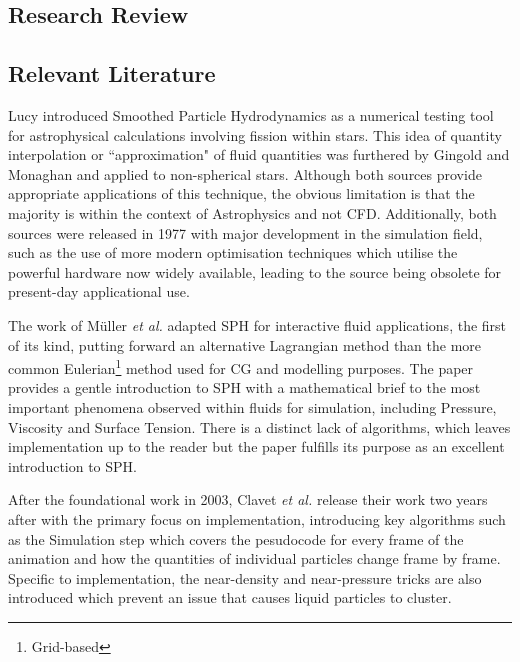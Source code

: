 \documentclass[a4paper,11pt]{article}
\begin{document}
\begin{multicols}{2}
\section{Research Review}
\subsection{Relevant Literature}
Lucy \cite{lucy} introduced Smoothed Particle Hydrodynamics as a numerical testing tool for astrophysical calculations involving fission within stars. This idea of quantity interpolation or ``approximation" of fluid quantities was furthered by Gingold and Monaghan \cite{gingold} and applied to non-spherical stars. Although both sources provide appropriate applications of this technique, the obvious limitation is that the majority is within the context of Astrophysics and not CFD. Additionally, both sources were released in 1977 with major development in the simulation field, such as the use of more modern optimisation techniques which utilise the powerful hardware now widely available, leading to the source being obsolete for present-day applicational use.

The work of Müller \textit{et al.} \cite{muller} adapted SPH for interactive fluid applications, the first of its kind, putting forward an alternative Lagrangian method than the more common Eulerian\footnote{Grid-based} method used for CG and modelling purposes. The paper provides a gentle introduction to SPH with a mathematical brief to the most important phenomena observed within fluids for simulation, including Pressure, Viscosity and Surface Tension. There is a distinct lack of algorithms, which leaves implementation up to the reader but the paper fulfills its purpose as an excellent introduction to SPH.

After the foundational work in 2003, Clavet \textit{et al.} \cite{clavet} release their work two years after with the primary focus on implementation, introducing key algorithms such as the Simulation step which covers the pesudocode for every frame of the animation and how the quantities of individual particles change frame by frame. Specific to implementation, the near-density and near-pressure tricks are also introduced which prevent an issue that causes liquid particles to cluster.%


\end{multicols}
\end{document}
